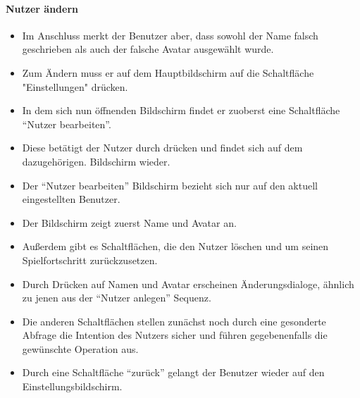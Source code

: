 \paragraph{Nutzer ändern}\mbox{}\newline
\begin{itemize}
\item Im Anschluss merkt der Benutzer aber, dass sowohl der Name falsch geschrieben
als auch der falsche Avatar ausgewählt wurde.
\item Zum Ändern muss er auf dem Hauptbildschirm auf die Schaltfläche "Einstellungen" drücken.
\item In dem sich nun öffnenden Bildschirm findet er zuoberst eine Schaltfläche ``Nutzer bearbeiten''.
\item Diese betätigt der Nutzer durch drücken und findet sich auf dem dazugehörigen.
Bildschirm wieder. 
\item Der ``Nutzer bearbeiten'' Bildschirm bezieht sich nur auf den aktuell eingestellten Benutzer.
\item Der Bildschirm zeigt zuerst Name und Avatar an.
\item Außerdem gibt es Schaltflächen, die den Nutzer löschen und um seinen Spielfortschritt
zurückzusetzen. 
\item Durch Drücken auf Namen und Avatar erscheinen Änderungsdialoge,
ähnlich zu jenen aus der ``Nutzer anlegen'' Sequenz.
\item Die anderen Schaltflächen stellen zunächst noch durch eine gesonderte Abfrage die Intention des 
Nutzers sicher und führen gegebenenfalls die gewünschte Operation aus.
\item Durch eine Schaltfläche ``zurück'' gelangt der Benutzer wieder auf den Einstellungsbildschirm.
\end{itemize}
